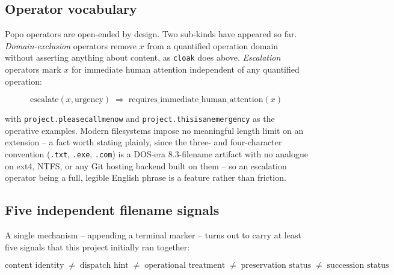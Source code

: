 \documentclass[11pt]{article}
\begin{document}
\subsection{Operator vocabulary}

Popo operators are open-ended by design. Two sub-kinds have appeared so far. \emph{Domain-exclusion} operators remove $x$ from a quantified operation domain without asserting anything about content, as \texttt{cloak} does above. \emph{Escalation} operators mark $x$ for immediate human attention independent of any quantified operation:

\begin{equation}
\mathrm{escalate}(x, \text{urgency}) \;\Rightarrow\; \text{requires\_immediate\_human\_attention}(x)
\end{equation}

with \texttt{project.pleasecallmenow} and \texttt{project.thisisanemergency} as the operative examples. Modern filesystems impose no meaningful length limit on an extension -- a fact worth stating plainly, since the three- and four-character convention (\texttt{.txt}, \texttt{.exe}, \texttt{.com}) is a DOS-era 8.3-filename artifact with no analogue on ext4, NTFS, or any Git hosting backend built on them -- so an escalation operator being a full, legible English phrase is a feature rather than friction.

\subsection{Five independent filename signals}

A single mechanism -- appending a terminal marker -- turns out to carry at least five signals that this project initially ran together:

\begin{equation}
\text{content identity} \;\neq\; \text{dispatch hint} \;\neq\; \text{operational treatment} \;\neq\; \text{preservation status} \;\neq\; \text{succession status}
\end{equation}
\end{document}
